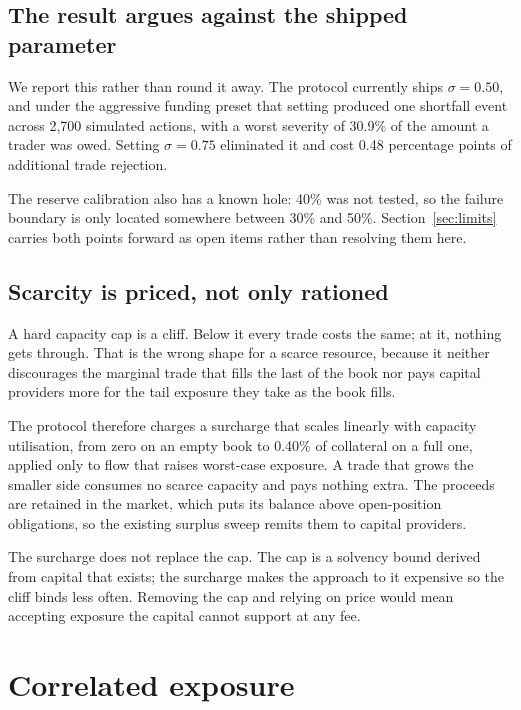 \documentclass[11pt,a4paper]{article}
\begin{document}
\subsection{The result argues against the shipped parameter}

We report this rather than round it away. The protocol currently ships $\sigma = 0.50$, and
under the aggressive funding preset that setting produced one shortfall event across 2{,}700
simulated actions, with a worst severity of 30.9\% of the amount a trader was owed. Setting
$\sigma = 0.75$ eliminated it and cost 0.48 percentage points of additional trade rejection.

The reserve calibration also has a known hole: 40\% was not tested, so the failure boundary
is only located somewhere between 30\% and 50\%. Section~\ref{sec:limits} carries both points
forward as open items rather than resolving them here.

\subsection{Scarcity is priced, not only rationed}

A hard capacity cap is a cliff. Below it every trade costs the same; at it, nothing gets
through. That is the wrong shape for a scarce resource, because it neither discourages the
marginal trade that fills the last of the book nor pays capital providers more for the tail
exposure they take as the book fills.

The protocol therefore charges a surcharge that scales linearly with capacity utilisation,
from zero on an empty book to 0.40\% of collateral on a full one, applied only to flow that
raises worst-case exposure. A trade that grows the smaller side consumes no scarce capacity
and pays nothing extra. The proceeds are retained in the market, which puts its balance above
open-position obligations, so the existing surplus sweep remits them to capital providers.

The surcharge does not replace the cap. The cap is a solvency bound derived from capital that
exists; the surcharge makes the approach to it expensive so the cliff binds less often.
Removing the cap and relying on price would mean accepting exposure the capital cannot
support at any fee.

\section{Correlated exposure}
\label{sec:correlation}
\end{document}
